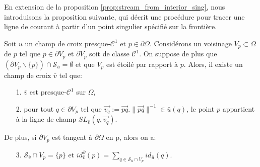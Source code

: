 En extension de la proposition \ref{prop:stream_from_interior_sing}, nous introduisons la proposition suivante, qui décrit une procédure pour tracer une ligne de courant à partir d'un point singulier spécifié sur la frontière.

\begin{proposition}
\label{prop:stream_from_bord_sing}
Soit $\bar{u}$ un champ de croix presque-$\mathcal{C}^1$ et $p\in\partial\Omega$. Considérons un voisinage $V_p\subset\Omega$ de $p$ tel que $p\in\partial V_p$ et $\partial V_p$ soit de classe $\mathcal{C}^1$. On suppose de plus que $(\partial V_p\backslash\{p\})\cap\mathcal{S}_{\bar{u}}=\emptyset$ et que $V_p$ est étoilé par rapport à $p$. Alors, il existe un champ de croix $\bar{v}$ tel que:
\begin{enumerate}
\item[1.] $\bar{v}$ est presque-$\mathcal{C}^1$ sur $\Omega$,\\[-0.3cm]
\item[2.] pour tout $q\in \partial V_p$ tel que $\overrightarrow{v_q}:=\overrightarrow{pq}.\|\overrightarrow{pq}\|^{-1}\in \bar{u}(q)$, le point $p$ appartient à la ligne de champ $SL_{\bar{v}}(q,\overrightarrow{v_q})$.\\[-0.3cm]
\end{enumerate}
De plus, si $\partial V_p$ est tangent à $\partial\Omega$ en p, alors on a:
\begin{enumerate}
\item[3.] $\mathcal{S}_{\bar{v}}\cap V_p =\{p\}$ et $id^\partial_{\bar{v}}(p)=\sum_{q\in \mathcal{S}_{\bar{u}}\cap V_p} id_{\bar{u}}(q)$.\\[-0.3cm]
\end{enumerate}
\end{proposition}

